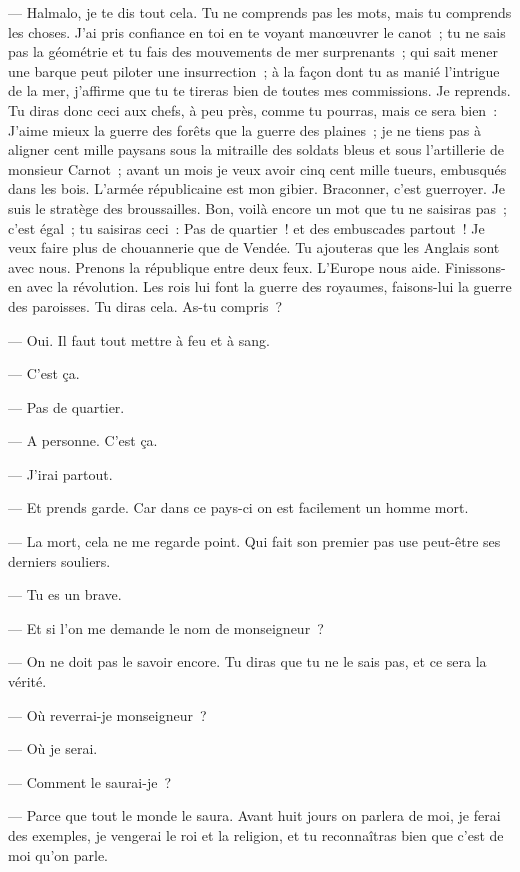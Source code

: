 \documentclass[french,twoside]{book} %
\begin{document}
— Halmalo, je te dis tout cela. Tu ne comprends pas les mots, mais tu comprends les choses. J’ai pris confiance en toi en te voyant manœuvrer le canot ; tu ne sais pas la géométrie et tu fais des mouvements de mer surprenants ; qui sait mener une barque peut  piloter une insurrection ; à la façon dont tu as manié l’intrigue de la mer, j’affirme que tu te tireras bien de toutes mes commissions. Je reprends. Tu diras donc ceci aux chefs, à peu près, comme tu pourras, mais ce sera bien : J’aime mieux la guerre des forêts que la guerre des plaines ; je ne tiens pas à aligner cent mille paysans sous la mitraille des soldats bleus et sous l’artillerie de monsieur Carnot ; avant un mois je veux avoir cinq cent mille tueurs, embusqués dans les bois. L’armée républicaine est mon gibier. Braconner, c’est guerroyer. Je suis le stratège des broussailles. Bon, voilà encore un mot que tu ne saisiras pas ; c’est égal ; tu saisiras ceci : Pas de quartier ! et des embuscades partout ! Je veux faire plus de chouannerie que de Vendée. Tu ajouteras que les Anglais sont avec nous. Prenons la république entre deux feux. L’Europe nous aide. Finissons-en avec la révolution. Les rois lui font la guerre des royaumes, faisons-lui la guerre des paroisses. Tu diras cela. As-tu compris ?\par
— Oui. Il faut tout mettre à feu et à sang.\par
— C’est ça.\par
— Pas de quartier.\par
— A personne. C’est ça.\par
— J’irai partout.\par
— Et prends garde. Car dans ce pays-ci on est facilement un homme mort.\par
— La mort, cela ne me regarde point. Qui fait son premier pas use peut-être ses derniers souliers.\par
— Tu es un brave.\par
— Et si l’on me demande le nom de monseigneur ?\par
 — On ne doit pas le savoir encore. Tu diras que tu ne le sais pas, et ce sera la vérité.\par
— Où reverrai-je monseigneur ?\par
— Où je serai.\par
— Comment le saurai-je ?\par
— Parce que tout le monde le saura. Avant huit jours on parlera de moi, je ferai des exemples, je vengerai le roi et la religion, et tu reconnaîtras bien que c’est de moi qu’on parle.\par
\end{document}
